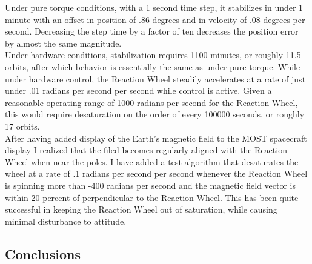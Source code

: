 \documentclass[12pt,letterpaper]{report}
\begin{document}
Under pure torque conditions, with a 1 second time step, it stabilizes in under 1 minute with an offset in position of .86 degrees and in velocity of .08 degrees per second. Decreasing the step time by a factor of ten decreases the position error by almost the same magnitude.
\\

Under hardware conditions, stabilization requires 1100 minutes, or roughly 11.5 orbits, after which behavior is essentially the same as under pure torque. While under hardware control, the Reaction Wheel steadily accelerates at a rate of just under .01 radians per second per second while control is active. Given a reasonable operating range of 1000 radians per second for the Reaction Wheel, this would require desaturation on the order of every 100000 seconds, or roughly 17 orbits.
\\

After having added display of the Earth's magnetic field to the MOST spacecraft display I realized that the filed becomes regularly aligned with the Reaction Wheel when near the poles. I have added a test algorithm that desaturates the wheel at a rate of .1 radians per second per second whenever the Reaction Wheel is spinning more than -400 radians per second and the magnetic field vector is within 20 percent of perpendicular to the Reaction Wheel. This has been quite successful in keeping the Reaction Wheel out of saturation, while causing minimal disturbance to attitude.

\subsection{Conclusions}
\end{document}
